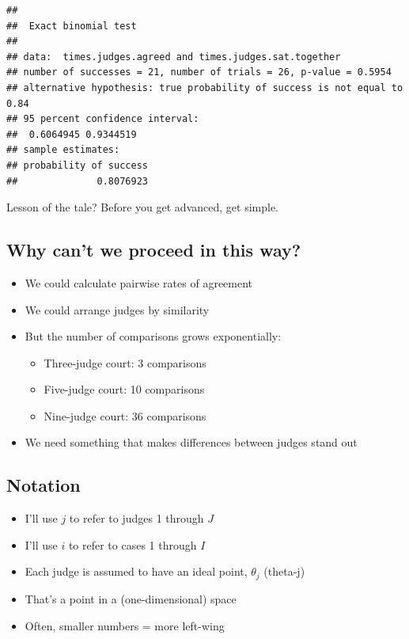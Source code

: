 \documentclass[12pt,twoside]{article}
\providecommand{\tightlist}{%
  \setlength{\itemsep}{0pt}\setlength{\parskip}{0pt}}
\begin{document}
\begin{verbatim}
## 
##  Exact binomial test
## 
## data:  times.judges.agreed and times.judges.sat.together
## number of successes = 21, number of trials = 26, p-value = 0.5954
## alternative hypothesis: true probability of success is not equal to 0.84
## 95 percent confidence interval:
##  0.6064945 0.9344519
## sample estimates:
## probability of success 
##              0.8076923
\end{verbatim}

Lesson of the tale? Before you get advanced, get simple.

\subsection{Why can't we proceed in this
way?}\label{why-cant-we-proceed-in-this-way}

\begin{itemize}
\tightlist
\item
  We could calculate pairwise rates of agreement
\item
  We could arrange judges by similarity
\item
  But the number of comparisons grows exponentially:

  \begin{itemize}
  \tightlist
  \item
    Three-judge court: 3 comparisons
  \item
    Five-judge court: 10 comparisons
  \item
    Nine-judge court: 36 comparisons
  \end{itemize}
\item
  We need something that makes differences between judges stand out
\end{itemize}

\subsection{Notation}\label{notation}

\begin{itemize}
\tightlist
\item
  I'll use \(j\) to refer to judges 1 through \(J\)
\item
  I'll use \(i\) to refer to cases 1 through \(I\)
\item
  Each judge is assumed to have an ideal point, \(\theta_j\) (theta-j)
\item
  That's a point in a (one-dimensional) space
\item
  Often, smaller numbers = more left-wing
\end{itemize}
\end{document}
